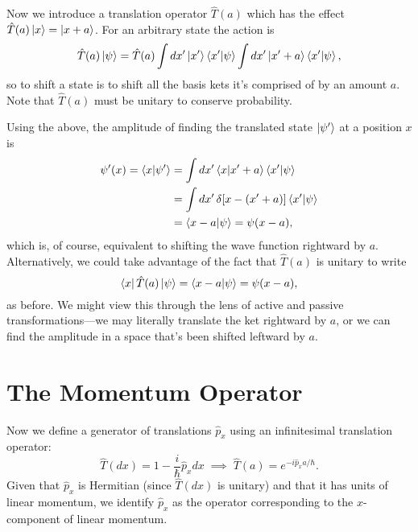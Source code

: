 \documentclass[../p116main.tex]{subfiles}
\begin{document}
Now we introduce a translation operator $\hat T(a)$ which has the effect $\hat T(a) \left| x \right> = \left| x+a \right>$.
For an arbitrary state the action is
\[ \hat T(a) \left| \psi \right> = \hat T(a) \int dx' \left| x' \right> \left< x' \middle| \psi \right> \int dx' \left| x' + a \right> \left< x' \middle| \psi \right>, \]
so to shift a state is to shift all the basis kets it's comprised of by an amount $a$.
Note that $\hat T(a)$ must be unitary to conserve probability.

Using the above, the amplitude of finding the translated state $\left| \psi' \right>$ at a position $x$ is
\begin{align*}
    \psi'(x) = \left< x \middle| \psi' \right> &= \int dx' \left< x \middle| x' + a \right> \left< x' \middle| \psi \right> \\
    &= \int dx' \, \delta[x - (x' + a)] \left< x' \middle| \psi \right> \\
    &= \left< x-a \middle| \psi \right> = \psi(x-a),
\end{align*}
which is, of course, equivalent to shifting the wave function rightward by $a$.
Alternatively, we could take advantage of the fact that $\hat T(a)$ is unitary to write
\[ \left< x \right| \hat T(a) \left| \psi \right> = \left< x-a \middle| \psi \right> = \psi(x-a), \]
as before.
We might view this through the lens of active and passive transformations---we may literally translate the ket rightward by $a$, or we can find the amplitude in a space that's been shifted leftward by $a$.

\section{The Momentum Operator}
Now we define a generator of translations $\hat p_x$ using an infinitesimal translation operator:
\[ \hat T(dx) = 1 - \frac{i}{\hbar} \hat p_x dx \;\implies\; \hat T(a) = e^{-i \hat p_x a / \hbar}. \]
Given that $\hat p_x$ is Hermitian (since $\hat T(dx)$ is unitary) and that it has units of linear momentum, we identify $\hat p_x$ as the operator corresponding to the $x$-component of linear momentum.
\end{document}

